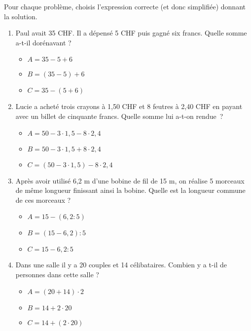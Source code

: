 \begin{exercice}
Pour chaque problème, choisis l'expression correcte (et donc simplifiée) donnant la solution.\\[-1em]
\begin{enumerate}
 \item Paul avait 35 CHF. Il a dépensé 5 CHF puis gagné six francs. Quelle somme a-t-il dorénavant ?
 \begin{itemize}
  \item $A = 35 - 5 + 6$
  \item $B = (35 - 5) + 6$
  \item $C = 35 - (5 + 6)$
  \end{itemize}
 \item Lucie a acheté trois crayons à 1,50 CHF et 8 feutres à 2,40 CHF en payant avec un billet de cinquante francs. Quelle somme lui a-t-on rendue ?
  \begin{itemize}
  \item $A = 50 - 3 \cdot 1,5 - 8 \cdot 2,4$
  \item $B = 50 - 3 \cdot 1,5 + 8 \cdot 2,4$
  \item $C = (50 - 3 \cdot 1,5) - 8 \cdot 2,4$
  \end{itemize}
 \item Après avoir utilisé 6,2 m d'une bobine de fil de 15 m, on réalise 5 morceaux de même longueur finissant ainsi la bobine. Quelle est la longueur commune de ces morceaux ?
  \begin{itemize}
   \item $A = 15 - (6,2 : 5)$
   \item $B = (15 - 6,2) : 5$
   \item $C = 15 - 6,2 : 5$
   \end{itemize}
 \item Dans une salle il y a 20 couples et 14 célibataires. Combien y a t-il de personnes dans cette salle ?
  \begin{itemize}
   \item $A = (20 + 14) \cdot 2$
   \item $B = 14 + 2 \cdot 20$
   \item $C = 14 + (2 \cdot 20)$
   \end{itemize}
 \end{enumerate}

\end{exercice}


